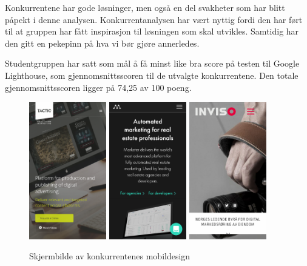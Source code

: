 Konkurrentene har gode løsninger, men også en del svakheter som har blitt påpekt i denne analysen. Konkurrentanalysen har vært nyttig fordi den har ført til at gruppen har fått inspirasjon til løsningen som skal utvikles. Samtidig har den gitt en pekepinn på hva vi bør gjøre annerledes.

Studentgruppen har satt som mål å få minst like bra score på testen til Google Lighthouse, som gjennomsnittsscoren til de utvalgte konkurrentene. Den totale gjennomsnittsscoren ligger på 74,25 av 100 poeng.
\begin{figure}[H]
    \begin{center}
        \includegraphics[width=0.3\textwidth]{line/tacticrealtime_com_(iPhone_6_7_8).png}
        \includegraphics[width=0.3\textwidth]{line/marketer_tech_(iPhone_6_7_8).png}
        \includegraphics[width=0.3\textwidth]{line/inviso_no_(iPhone_6_7_8).png}
        \caption{Skjermbilde av konkurrentenes mobildesign}
        \label{fig:competitors-mobile}
    \end{center}
\end{figure}

